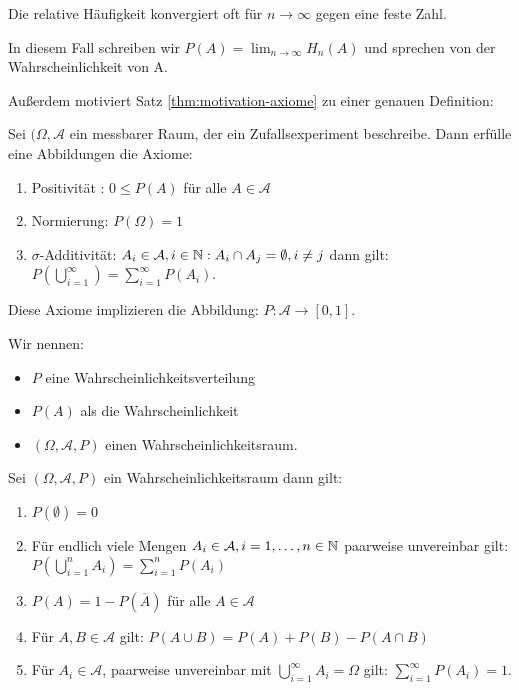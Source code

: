 \begin{notation}
Die relative Häufigkeit konvergiert oft für $n \to \infty$ gegen eine feste Zahl.

In diesem Fall schreiben wir $P(A) = \lim_{n \to \infty} H_n(A)$ und sprechen von der Wahrscheinlichkeit von A. 
\end{notation} 
Außerdem motiviert Satz \ref{thm:motivation-axiome} zu einer genauen Definition:
\begin{definition}
	Sei $(\Omega, \mathcal{A}$ ein messbarer Raum, der ein Zufallsexperiment beschreibe. Dann erfülle eine Abbildungen die Axiome:
	\begin{enumerate}[label=(\roman*)]
		\item Positivität : $0\le P(A)$ für alle $A \in \mathcal{A}$
		\item Normierung: $P(\Omega)=1$
		\item $\sigma$-Additivität: $A_i \in \mathcal{A}, i \in \mathbb{N}: A_i \cap A_j = \emptyset, i\neq j$ dann gilt: $P(\bigcup_{i=1}^{\infty}) = \sum_{i=1}^{\infty}P(A_i)$.  
	\end{enumerate}
	Diese Axiome implizieren die Abbildung: $P\colon \mathcal{A}\to [0,1]$. 
\end{definition}
\begin{notation}
Wir nennen:
\begin{itemize}
	\item $P$ eine Wahrscheinlichkeitsverteilung
	\item $P(A)$ als die Wahrscheinlichkeit
	\item $(\Omega, \mathcal{A}, P)$ einen Wahrscheinlichkeitsraum.
\end{itemize}
\end{notation}
\begin{theorem}Sei $(\Omega, \mathcal{A}, P)$ ein Wahrscheinlichkeitsraum dann gilt:
	\begin{enumerate}[label=\arabic*)]
		\item $P(\emptyset)=0$
		\item Für endlich viele Mengen $A_i \in \mathcal{A}, i=1,\ldots,n \in \mathbb{N}$ paarweise unvereinbar gilt:
				$P(\bigcup_{i=1}^{n} A_i) = \sum_{i=1}^{n}P(A_i)$
		\item $P(A) = 1- P(\overline{A})$ für alle $A \in \mathcal{A}$
		\item Für $A,B \in \mathcal{A}$ gilt: $P(A \cup B) = P(A)+P(B) -P(A \cap B)$
		\item Für $A_i \in \mathcal{A}$, paarweise unvereinbar mit $\bigcup_{i=1}^{\infty} A_i = \Omega$ gilt: $\sum_{i=1}^{\infty}P(A_i)=1$.  
	\end{enumerate}	
\end{theorem}
